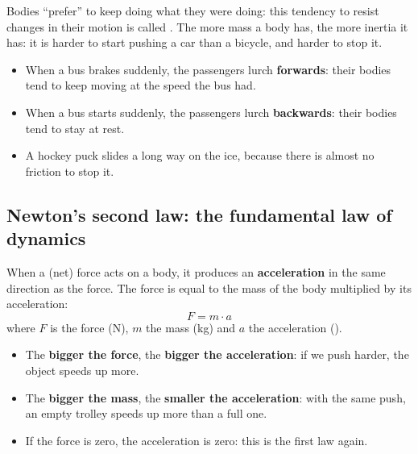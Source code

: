 Bodies ``prefer'' to keep doing what they were doing: this tendency to resist changes in their motion is called . The more mass a body has, the more inertia it has: it is harder to start pushing a car than a bicycle, and harder to stop it.

\begin{example}
    \begin{itemize}
        \item When a bus brakes suddenly, the passengers lurch \textbf{forwards}: their bodies tend to keep moving at the speed the bus had.
        \item When a bus starts suddenly, the passengers lurch \textbf{backwards}: their bodies tend to stay at rest.
        \item A hockey puck slides a long way on the ice, because there is almost no friction to stop it.
    \end{itemize}
\end{example}

\subsection{Newton's second law: the fundamental law of dynamics}

\begin{definition}
    When a (net) force acts on a body, it produces an \textbf{acceleration} in the same direction as the force. The force is equal to the mass of the body multiplied by its acceleration:
    \begin{equation*}
        F = m \cdot a
    \end{equation*}
    where \(F\) is the force (\unit{\newton}), \(m\) the mass (\unit{\kg}) and \(a\) the acceleration (\unit{\mpss}).
\end{definition}

\begin{impt}
    \begin{itemize}
        \item The \textbf{bigger the force}, the \textbf{bigger the acceleration}: if we push harder, the object speeds up more.
        \item The \textbf{bigger the mass}, the \textbf{smaller the acceleration}: with the same push, an empty trolley speeds up more than a full one.
        \item If the force is zero, the acceleration is zero: this is the first law again.
    \end{itemize}
\end{impt}

